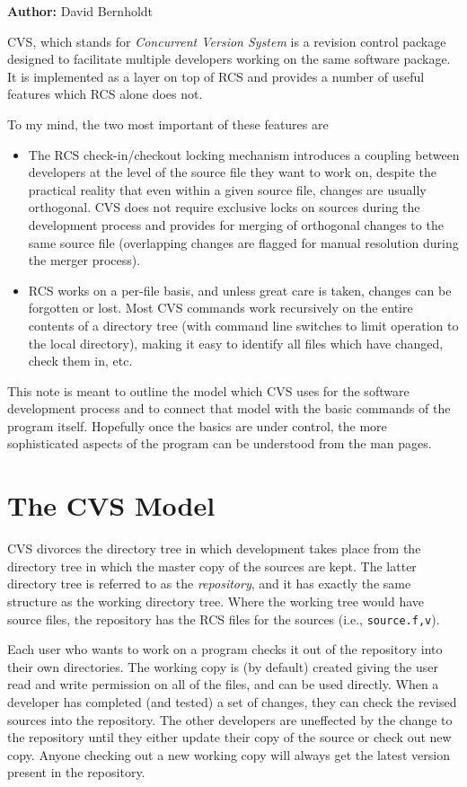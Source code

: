 \label{sec:cvs-intro}

{\bf Author:} David Bernholdt

CVS, which stands for {\it Concurrent Version System} is a revision
control package designed to facilitate multiple developers working on
the same software package.  It is implemented as a layer on top of RCS
and provides a number of useful features which RCS alone does not.

To my mind, the two most important of these features are 
\begin{itemize}
\item The RCS check-in/checkout locking mechanism introduces a coupling
between developers at the level of the source file they want to work
on, despite the practical reality that even within a given source
file, changes are usually orthogonal.  CVS does not require exclusive
locks on sources during the development process and provides for
merging of orthogonal changes to the same source file (overlapping
changes are flagged for manual resolution during the merger process).

\item RCS works on a per-file basis, and unless great care is taken,
changes can be forgotten or lost.  Most CVS commands work recursively
on the entire contents of a directory tree (with command line switches
to limit operation to the local directory), making it easy to identify
all files which have changed, check them in, etc.
\end{itemize}
This note
is meant to outline the model which CVS uses for the software
development process and to connect that model with the basic commands
of the program itself.  Hopefully once the basics are under control,
the more sophisticated aspects of the program can be understood from
the man pages.

\section{The CVS Model}

CVS divorces the directory tree in which development takes place from
the directory tree in which the master copy of the sources are kept.
The latter directory tree is referred to as the {\em repository}, and
it has exactly the same structure as the working directory tree.  Where
the working tree would have source files, the repository has the RCS
files for the sources (i.e., {\tt source.f,v}).

Each user who wants to work on a program checks it out of the
repository into their own directories.  The working copy is (by
default) created giving the user read and write permission on all of
the files, and can be used directly.  When a developer has completed
(and tested) a set of changes, they can check the revised sources into
the repository.  The other developers are uneffected by the change to
the repository until they either update their copy of the source or
check out new copy.  Anyone checking out a new working copy will
always get the latest version present in the repository.


